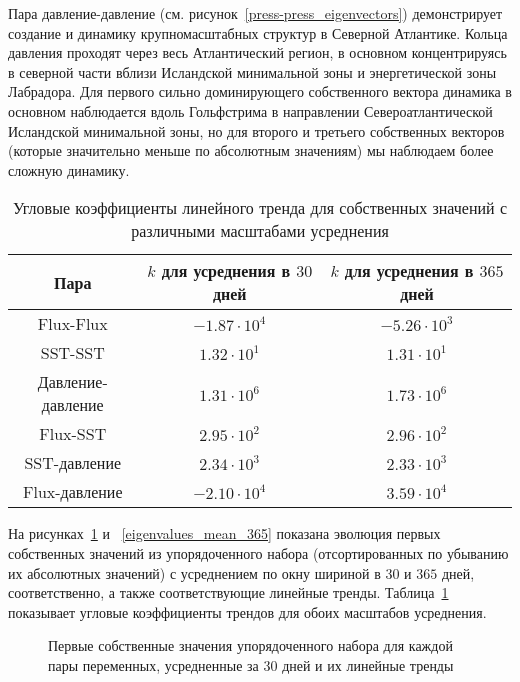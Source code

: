 Пара давление-давление (см. рисунок~\ref{press-press_eigenvectors}) демонстрирует создание и динамику крупномасштабных структур в Северной Атлантике. Кольца давления проходят через весь Атлантический регион, в основном концентрируясь в северной части вблизи Исландской минимальной зоны и энергетической зоны Лабрадора. Для первого сильно доминирующего собственного вектора динамика в основном наблюдается вдоль Гольфстрима в направлении Североатлантической Исландской минимальной зоны, но для второго и третьего собственных векторов (которые значительно меньше по абсолютным значениям) мы наблюдаем более сложную динамику.

\begin{table}
	\caption{Угловые коэффициенты линейного тренда для собственных значений с различными масштабами усреднения \label{table_angular_eigens}}
	\centering
	\begin{tabular}{|c|c|c|}
		\hline
		Пара & $k$ для усреднения в $30$ дней & $k$ для усреднения в $365$ дней\\
		\hline
		Flux-Flux & $-1.87 \cdot 10^{4}$ & $-5.26 \cdot 10^{3}$ \\
		SST-SST & $1.32 \cdot 10^{1}$ & $1.31 \cdot 10^{1}$ \\
		Давление-давление & $1.31 \cdot 10^{6}$ & $1.73 \cdot 10^{6}$ \\
		Flux-SST & $2.95 \cdot 10^{2}$ & $2.96 \cdot 10^{2}$ \\
		SST-давление & $2.34 \cdot 10^{3}$ & $2.33 \cdot 10^{3}$ \\
		Flux-давление & $-2.10 \cdot 10^{4}$ & $3.59 \cdot 10^{4}$ \\
		\hline
	\end{tabular}
\end{table}

На рисунках~\ref{eigenvalues_mean_30} и ~\ref{eigenvalues_mean_365} показана эволюция первых собственных значений из упорядоченного набора (отсортированных по убыванию их абсолютных значений) с усреднением по окну шириной в $30$ и $365$ дней, соответственно, а также соответствующие линейные тренды. Таблица~\ref{table_angular_eigens} показывает угловые коэффициенты трендов для обоих масштабов усреднения.


\begin{figure}
	\caption{Первые собственные значения упорядоченного набора для каждой пары переменных, усредненные за $30$ дней и их линейные тренды}
	\label{eigenvalues_mean_30}
\end{figure}


